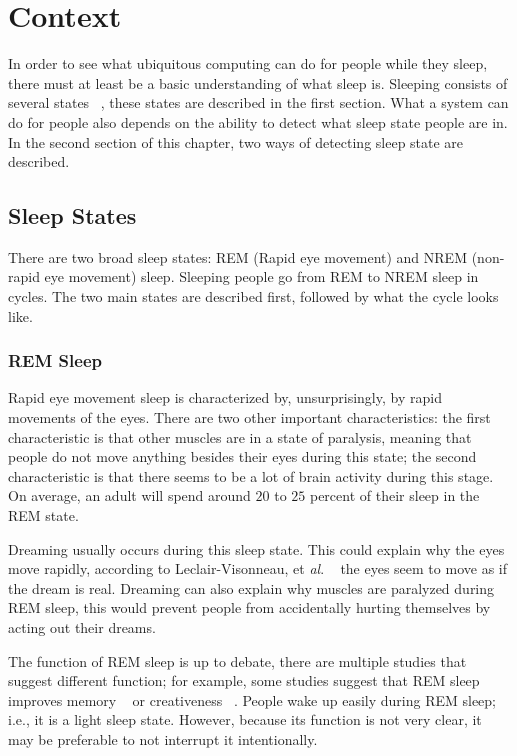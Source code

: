 \chapter{Context} %
\label{cha:context}
In order to see what ubiquitous computing can do for people while they sleep, there must at least be a basic understanding of what sleep is. Sleeping consists of several states ~\cite{Silber:2007fk}, these states are described in the first section. What a system can do for people also depends on the ability to detect what sleep state people are in. In the second section of this chapter, two ways of detecting sleep state are described.
 
\section{Sleep States} %
\label{sec:sleep_states}
There are two broad sleep states: REM (Rapid eye movement) and NREM (non-rapid eye movement) sleep. Sleeping people go from REM to NREM sleep in cycles. The two main states are described first, followed by what the cycle looks like.

\subsection{REM Sleep} %
\label{sub:rem_sleep}
Rapid eye movement sleep is characterized by, unsurprisingly, by rapid movements of the eyes. There are two other important characteristics: the first characteristic is that other muscles are in a state of paralysis, meaning that people do not move anything besides their eyes during this state; the second characteristic is that there seems to be a lot of brain activity during this stage. On average, an adult will spend around $20$ to $25$ percent of their sleep in the REM state.

Dreaming usually occurs during this sleep state. This could explain why the eyes move rapidly, according to Leclair-Visonneau, et \emph{al}. ~\cite{LeclairVisonneau:2010:Brain:20478849} the eyes seem to move as if the dream is real. Dreaming can also explain why muscles are paralyzed during REM sleep, this would prevent people from accidentally hurting themselves by acting out their dreams.

The function of REM sleep is up to debate, there are multiple studies that suggest different function; for example, some studies suggest that REM sleep improves memory ~\cite{Marshall:2006:Nature:17086200} or creativeness ~\cite{Wagner:2004:Nature:14737168}. People wake up easily during REM sleep; i.e., it is a light sleep state. However, because its function is not very clear, it may be preferable to not interrupt it intentionally.

